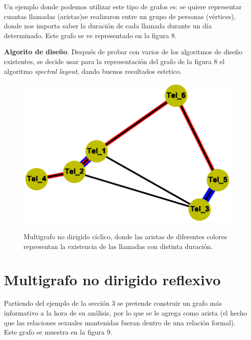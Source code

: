 \documentclass{article}
\begin{document}
Un ejemplo donde podemos utilizar este tipo de grafos es: se quiere representar cuantas llamadas (aristas)se realizaron entre un grupo de personas (vértices), donde nos importa saber la duración de cada llamada durante un día determinado. Este grafo se ve representado en la figura 8.\linebreak

\textbf{Algorito de diseño}.\linebreak
Después de probar con varios de los algoritmos de diseño existentes, se decide usar para la representación del grafo de la figura 8 el algoritmo \textit{spectral layout}, dando buenos resultados estetico.


\begin{center}

\end{center}
\begin{figure}[h]
\begin{center}
\includegraphics[scale=0.7]{Graf8_spectral_layout.eps}\\
\caption{Multigrafo no dirigido cíclico, donde las aristas de diferentes colores representan la existencia de las llamadas con distinta duración.}
\end{center}
\end{figure}
\section{Multigrafo no dirigido reflexivo}
Partiendo del ejemplo de la sección 3 se pretende construir un grafo más informativo a la hora de su análisis, por lo que se le agrega como arista (el hecho que las relaciones sexuales mantenidas fueran dentro de una relación formal). Este grafo se muestra en la figura 9.\linebreak
\end{document}
